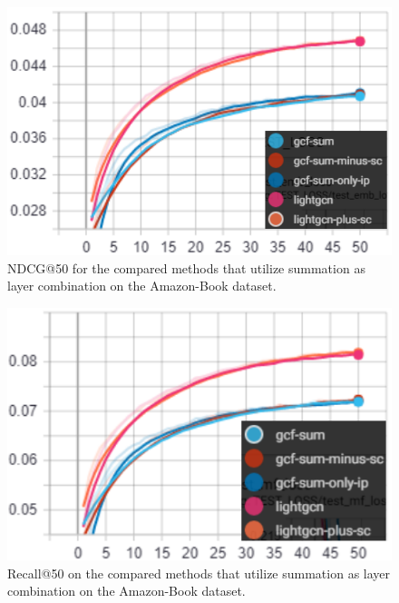 \begin{figure}[h!]
    \includegraphics[width=\linewidth]{figures/amazon-book-gcf-sum-ndcg.png}
    \caption{NDCG@50 for the compared methods that utilize summation as layer combination on the Amazon-Book dataset.}
    \label{fig:GCF-sum-NDCG-Amazon-Book-ablation-study}
\end{figure}
\begin{figure}[h!]
    \includegraphics[width=\linewidth]{figures/amazon-book-gcf-sum-recall.png}
    \caption{Recall@50 on the compared methods that utilize summation as layer combination on the Amazon-Book dataset.}
    \label{fig:GCF-sum-recall-Amazon-Book-ablation-study}
\end{figure}
